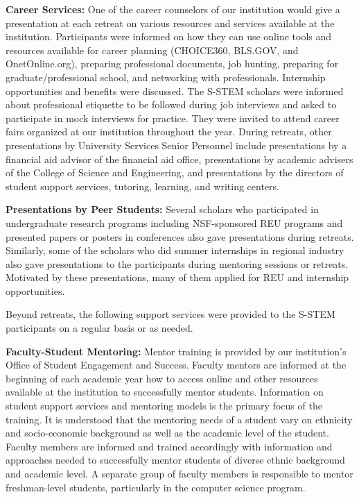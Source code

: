 \documentclass{article}
\begin{document}
\textbf{Career Services:} One of the career counselors of our institution would give a presentation at each retreat on various resources and services available at the institution. Participants were informed on how they can use online tools and resources available for career planning (CHOICE360, BLS.GOV, and OnetOnline.org), preparing professional documents, job hunting, preparing for graduate/professional school, and networking with professionals. Internship opportunities and benefits were discussed. The S-STEM scholars were informed about professional etiquette to be followed during job interviews and asked to participate in mock interviews for practice. They were invited to attend career fairs organized at our institution throughout the year. During retreats, other presentations by University Services Senior Personnel include presentations by a financial aid advisor of the financial aid office, presentations by academic advisers of the College of Science and Engineering, and presentations by the directors of student support services, tutoring, learning, and writing centers.

\textbf{Presentations by Peer Students:} Several scholars who participated in undergraduate research programs including NSF-sponsored REU programs and presented papers or posters in conferences also gave presentations during retreats. Similarly, some of the scholars who did summer internships in regional industry also gave presentations to the participants during mentoring sessions or retreats. Motivated by these presentations, many of them applied for REU and internship opportunities.

 Beyond retreats, the following support services were provided to the S-STEM participants on a regular basis or as needed.
 
\textbf{Faculty-Student Mentoring:} Mentor training is provided by our institution’s Office of Student Engagement and Success. Faculty mentors are informed at the beginning of each academic year how to access online and other resources available at the institution to successfully mentor students. Information on student support services and mentoring models is the primary focus of the training.  It is understood that the mentoring needs of a student vary on ethnicity and socio-economic background as well as the academic level of the student. Faculty members are informed and trained accordingly with information and approaches needed to successfully mentor students of diverse ethnic background and academic level. A separate group of faculty members is responsible to mentor freshman-level students, particularly in the computer science program. 
\end{document}
